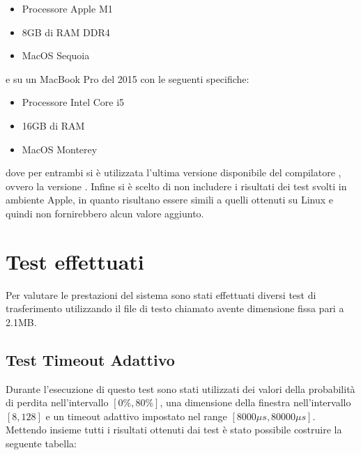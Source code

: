 \begin{itemize}
    \item Processore Apple M1
    \item 8GB di RAM DDR4
    \item MacOS Sequoia
\end{itemize}

e su un MacBook Pro del 2015 con le seguenti specifiche:

\begin{itemize}
    \item Processore Intel Core i5
    \item 16GB di RAM
    \item MacOS Monterey
\end{itemize}

dove per entrambi si è utilizzata l'ultima versione disponibile del compilatore , ovvero la versione .
Infine si è scelto di non includere i risultati dei test svolti in ambiente Apple, in quanto risultano essere simili a quelli ottenuti su Linux e quindi non fornirebbero alcun valore aggiunto.

\section{Test effettuati}
Per valutare le prestazioni del sistema sono stati effettuati diversi test di trasferimento utilizzando il file di testo chiamato  avente dimensione fissa pari a 2.1MB.

\subsection{Test Timeout Adattivo}
Durante l'esecuzione di questo test sono stati utilizzati dei valori della probabilità di perdita nell'intervallo $[0\%, 80\%]$, una dimensione della finestra nell'intervallo $[8, 128]$ e un timeout adattivo impostato nel range $[8000 \mu s, 80000 \mu s]$.
Mettendo insieme tutti i risultati ottenuti dai test è stato possibile costruire la seguente tabella:

